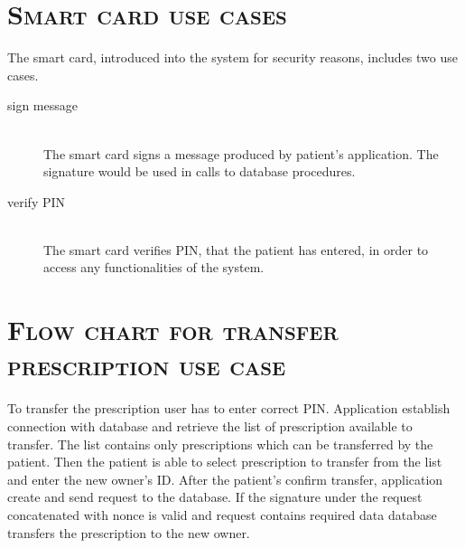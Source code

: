\section{\textsc{Smart card use cases}}
The smart card, introduced into the system for security reasons, includes two use cases.
\begin{description}
\item[sign message] \hfill \\
The smart card signs a message produced by patient's application. 
The signature would be used in calls to database procedures.
\item[verify PIN] \hfill \\
The smart card verifies PIN, that the patient has entered, in order to access any functionalities of the system.
\end{description}
\section{\textsc{Flow chart for transfer prescription use case}}
To transfer the prescription user has to enter correct PIN. 
Application establish connection with database and retrieve the list of prescription available to transfer. 
The list contains only prescriptions which can be transferred by the patient. 
Then the patient is able to select prescription to transfer from the list and enter the new owner's ID. 
After the patient's confirm transfer, application create and send request to the database. 
If the signature under the request concatenated with nonce is valid and request contains required data database transfers the prescription to the new owner.

